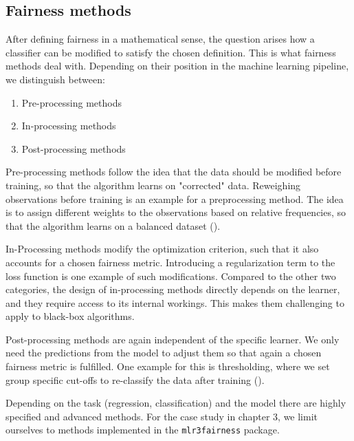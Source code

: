 \subsection{Fairness methods}
After defining fairness in a mathematical sense, the question arises how a classifier can be modified to satisfy the chosen definition. This is what fairness methods deal with.
Depending on their position in the machine learning pipeline, we distinguish between:
\begin{enumerate}
    \item Pre-processing methods
    \item In-processing methods
    \item Post-processing methods
\end{enumerate}
Pre-processing methods follow the idea that the data should be modified before training, so that the algorithm learns on "corrected" data. Reweighing observations before training is an example for a preprocessing method. The idea is to assign different weights to the observations based on relative frequencies, so that the algorithm learns on a balanced dataset (\cite{caton2024}).\par
In-Processing methods modify the optimization criterion, such that it also accounts for a chosen fairness metric. Introducing a regularization term to the loss function is one example of such modifications. Compared to the other two categories, the design of in-processing methods directly depends on the learner, and they require access to its internal workings. This makes them challenging to apply to black-box algorithms.\par
Post-processing methods are again independent of the specific learner. We only need the predictions from the model to adjust them so that again a chosen fairness metric is fulfilled. One example for this is thresholding, where we set group specific cut-offs to re-classify the data after training (\cite{hardt2016}).\par
Depending on the task (regression, classification) and the model there are highly specified and advanced methods. For the case study in chapter 3, we limit ourselves to methods implemented in the \texttt{mlr3fairness} package.

